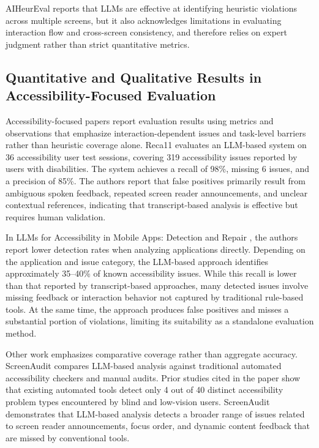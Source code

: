 \documentclass[acmsmall,nonacm]{acmart}
\begin{document}
AIHeurEval \cite{wang2024aiheureval} reports that LLMs are effective at identifying heuristic violations across multiple screens, but it also acknowledges limitations in evaluating interaction flow and cross-screen consistency, and therefore relies on expert judgment rather than strict quantitative metrics.

\subsection{Quantitative and Qualitative Results in Accessibility-Focused Evaluation}

Accessibility-focused papers report evaluation results using metrics and observations that emphasize interaction-dependent issues and task-level barriers rather than heuristic coverage alone. Reca11 \cite{huq2023reca11} evaluates an LLM-based system on 36 accessibility user test sessions, covering 319 accessibility issues reported by users with disabilities. The system achieves a recall of 98\%, missing 6 issues, and a precision of 85\%. The authors report that false positives primarily result from ambiguous spoken feedback, repeated screen reader announcements, and unclear contextual references, indicating that transcript-based analysis is effective but requires human validation.

In LLMs for Accessibility in Mobile Apps: Detection and Repair \cite{aljedaani2024llm_accessibility}, the authors report lower detection rates when analyzing applications directly. Depending on the application and issue category, the LLM-based approach identifies approximately 35--40\% of known accessibility issues. While this recall is lower than that reported by transcript-based approaches, many detected issues involve missing feedback or interaction behavior not captured by traditional rule-based tools. At the same time, the approach produces false positives and misses a substantial portion of violations, limiting its suitability as a standalone evaluation method.

Other work emphasizes comparative coverage rather than aggregate accuracy. ScreenAudit \cite{zhong2024screenaudit} compares LLM-based analysis against traditional automated accessibility checkers and manual audits. Prior studies cited in the paper show that existing automated tools detect only 4 out of 40 distinct accessibility problem types encountered by blind and low-vision users. ScreenAudit \cite{zhong2024screenaudit} demonstrates that LLM-based analysis detects a broader range of issues related to screen reader announcements, focus order, and dynamic content feedback that are missed by conventional tools.
\end{document}
